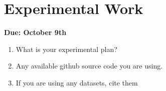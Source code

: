 \section{Experimental Work} 
{\bf Due: October 9th}
\begin{enumerate}
    \item What is your experimental plan?
    \item Any available github source code you are using.
    \item If you are using any datasets, cite them 
\end{enumerate}